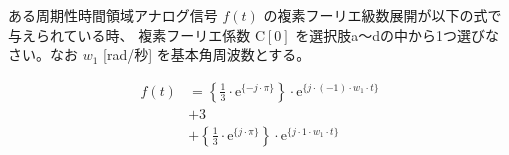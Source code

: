 ある周期性時間領域アナログ信号 $f(t)$ の複素フーリエ級数展開が以下の式で与えられている時、
複素フーリエ係数 $\textrm{C}[0]$ を選択肢a〜dの中から1つ選びなさい。なお $w_1$ [rad/秒] を基本角周波数とする。

\begin{align*}
f(t) 
&= \left \{ \frac{1}{3} \cdot \textrm{e}^{\{-j \cdot \pi \}} \right \} \cdot \textrm{e}^{\{ j \cdot (-1) \cdot w_1 \cdot t \}} \\
&+ 3 \\
&+ \left \{ \frac{1}{3} \cdot \textrm{e}^{\{ j \cdot \pi \}} \right \} \cdot \textrm{e}^{\{ j \cdot    1 \cdot w_1 \cdot t \}} 
\end{align*}
